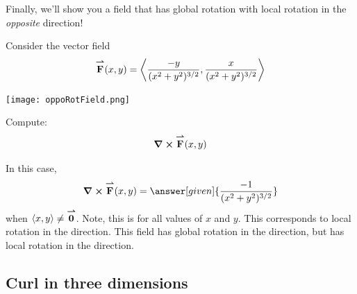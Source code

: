 \documentclass{ximera}
\begin{document}
Finally, we'll show you a field that has global rotation with local
rotation in the \textit{opposite} direction!
\begin{example}
  Consider the vector field
  \[
  {\overset{\boldsymbol{\rightharpoonup}}{\mathbf{F}}}(x,y) = \left\langle \frac{-y}{(x^2+y^2)^{3/2}},\frac{x}{(x^2+y^2)^{3/2}}\right\rangle
  \]
  \begin{image}
    \texttt{[image: oppoRotField.png]}
  \end{image}
  Compute:
  \[
  \boldsymbol\nabla\boldsymbol\times{\overset{\boldsymbol{\rightharpoonup}}{\mathbf{F}}}(x,y)
  \]
  \begin{explanation}
    In this case,
    \[
    \curl\vec{F}(x,y) =\answer[given]{\frac{-1}{(x^2+y^2)^{3/2}}}
    \]
    when $\left\langle x,y\right\rangle\ne {\overset{\boldsymbol{\rightharpoonup}}{\mathbf{0}}}$. Note, this is
     for all
    values of $x$ and $y$. This corresponds to local rotation in the
    direction.  This field has global rotation in the
    direction, but has local rotation in the
    direction.
  \end{explanation}
\end{example}


\subsection{Curl in three dimensions}
\end{document}
